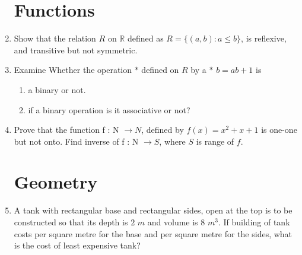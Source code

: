 \documentclass{article}
\begin{document}
\begin{enumerate}
\section{Functions}
\item Show that the relation $R$ on $\mathbb{R}$ defined as $R = \{(a, b) : a \leq b\}$, is reflexive, and transitive but not symmetric.
\item Examine Whether the operation $*$ defined on $R$ by a $*$ $b = ab+1$ is
\begin{enumerate}
    \item a binary or not.
    \item if a binary operation is it associative or not?
\end{enumerate}
\item Prove that the function f : N $\xrightarrow{} N$, defined by $f(x) = {x^2}+x+1$  is one-one but not onto. Find inverse of f : N $\xrightarrow{} S$, where $S$ is range of $f$.
\section{Geometry}
\item A tank with rectangular base and rectangular sides, open at the top is to be constructed so that its depth is $2$ $m$ and volume is 8 $m^3$. If building of tank costs  per square metre for the base and  per square metre for the sides, what is the cost of least expensive tank?  

\end{enumerate}
\end{document}
